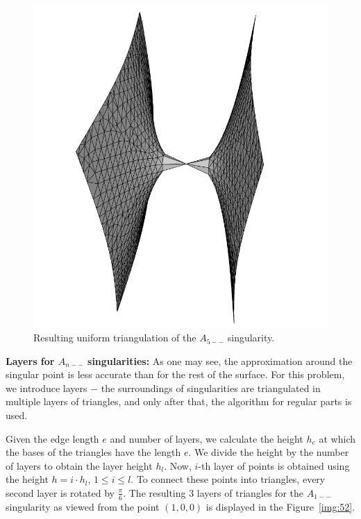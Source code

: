 \begin{figure}
    \centerline{\includegraphics[scale=0.25]{images/A5-uniform}}
    \caption[Resulting uniform triangulation of the $A_{5--}$ singularity]
    {Resulting uniform triangulation of the $A_{5--}$ singularity.}
    \label{img:A5uniform}
\end{figure}

\textbf{Layers for $A_{n--}$ singularities:}
As one may see, the approximation around the singular
point is less accurate than for the rest of the surface.
For this problem, we introduce layers $-$ the surroundings of singularities are
triangulated in multiple layers of triangles, and only after that, the algorithm for
regular parts is used.

Given the edge length $e$ and number of layers, we calculate the height $h_e$ 
at which the bases of the triangles
have the length $e$. We divide the height by the number of layers to obtain the
layer height $h_l$. Now, $i$-th layer of points is obtained using the height
$h = i\cdot h_l$, $1\leq i \leq l$. To connect these points into triangles, every second
layer is rotated by $\frac{\pi}{6}$. The resulting 3 layers of triangles
for the $A_{1--}$ singularity as viewed from the point $(1, 0, 0)$ is displayed in
the Figure~\ref{img:52}. 

